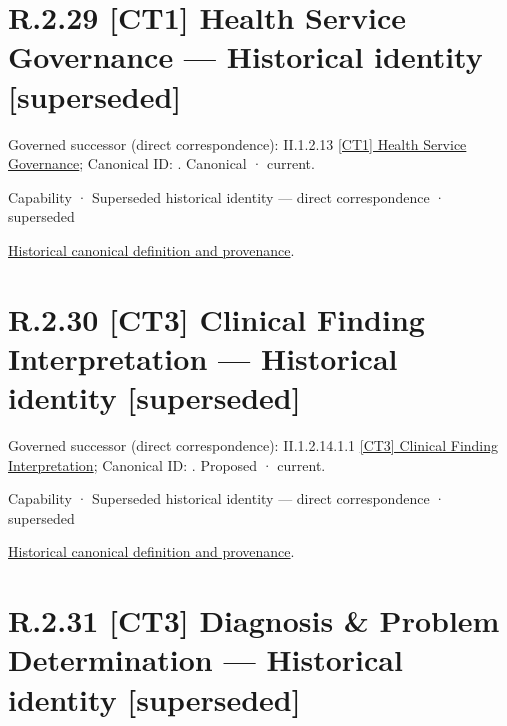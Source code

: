 \section*{R.2.29 [CT1] Health Service Governance — Historical identity [superseded]}
\label{navigation:R.2.29}

{\small Governed successor (direct correspondence): II.1.2.13 \hyperref[element:209aada781e844e28202a2535a264c21]{[CT1] Health Service Governance}; Canonical ID: \texttt{}. Canonical · current.}\par
\label{element:24f3dd30223142efa35a5826552d53ab}
{\small Capability · Superseded historical identity — direct correspondence · superseded}\par
\href{../../../../../../../continuum/strategy/capability/24f3dd30223142efa35a5826552d53ab.md}{Historical canonical definition and provenance}.\par
\section*{R.2.30 [CT3] Clinical Finding Interpretation — Historical identity [superseded]}
\label{navigation:R.2.30}

{\small Governed successor (direct correspondence): II.1.2.14.1.1 \hyperref[element:deb78ba3b1514074a8ca5bc5da0673f5]{[CT3] Clinical Finding Interpretation}; Canonical ID: \texttt{}. Proposed · current.}\par
\label{element:cf8ddfca7a8e4ed893ec39b795200d77}
{\small Capability · Superseded historical identity — direct correspondence · superseded}\par
\href{../../../../../../../continuum/strategy/capability/cf8ddfca7a8e4ed893ec39b795200d77.md}{Historical canonical definition and provenance}.\par
\section*{R.2.31 [CT3] Diagnosis \& Problem Determination — Historical identity [superseded]}
\label{navigation:R.2.31}

